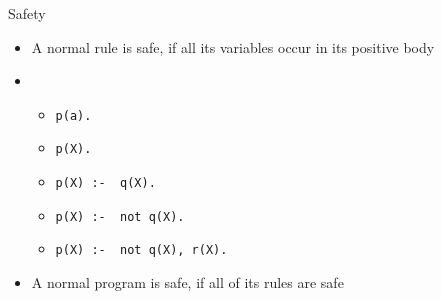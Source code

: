 \begin{frame}{Safety}
  \bigskip
  \begin{itemize}
  \item A normal rule is \alert{safe}, if all its variables occur in its positive body
    \smallskip
  \item<2-> 
    \begin{itemize}\normalsize
    \item<3-> \lstinline{p(a).}                    
    \item<3-> \lstinline{p(X).}                    
    \item<3-> \lstinline{p(X) :-  q(X).}           
    \item<3-> \lstinline{p(X) :-  not q(X).}       
    \item<3-> \lstinline{p(X) :-  not q(X), r(X).} 
    \end{itemize}
    \medskip
  \item<9-> A normal program is safe, if all of its rules are safe
  \end{itemize}
\end{frame}
